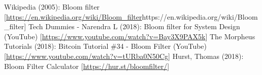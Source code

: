 \documentclass[a4paper, 11pt]{article}
\begin{document}
\begin{thebibliography}{9}
Wikipedia (2005): Bloom filter [\url{https://en.wikipedia.org/wiki/Bloom\_filter}{https://en.wikipedia.org/wiki/Bloom\_filter}]
Tech Dummies - Narendra L (2018): Bloom filter for System Design (YouTube) [\url{https://www.youtube.com/watch?v=Bay3X9PAX5k}]
The Morpheus Tutorials (2018): Bitcoin Tutorial \#34 - Bloom Filter (YouTube) [\url{https://www.youtube.com/watch?v=tURba0N50Cg}]
 Hurst, Thomas (2018): Bloom Filter Calculator [\url{https://hur.st/bloomfilter/}]
\end{thebibliography}
\end{document}
